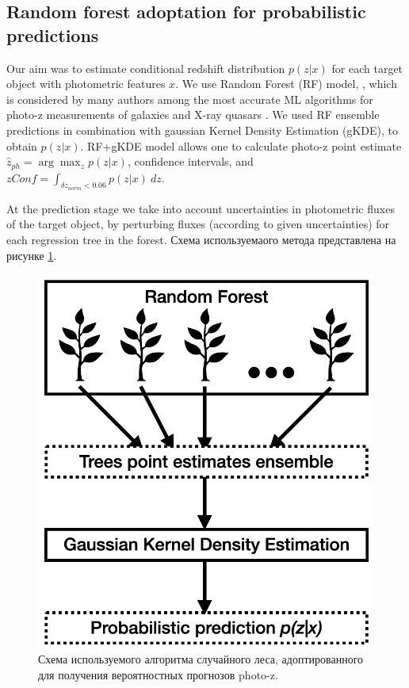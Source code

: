 \documentclass[fleqn,usenatbib]{mnras}
\begin{document}
\subsection{Random forest adoptation for probabilistic predictions}
Our aim was to estimate conditional redshift distribution $p(z|x)$ for each target object with photometric features $x$.
We use Random Forest (RF) model, \citep{2001MachL..45....5B,JMLR:v7:meinshausen06a}, which is considered by many authors among the most accurate ML algorithms for photo-z measurements of galaxies \citep{2020MNRAS.499.1587S,2020arXiv200912112E} and X-ray quasars \citep{2018AstL...44..735M}. We used RF ensemble predictions in combination with gaussian Kernel Density Estimation (gKDE), to obtain $p(z|x)$. RF+gKDE model allows one to calculate photo-z point estimate $\hat{z}_{ph} = \arg\max_z p(z|x)$, confidence intervals, and $zConf = \int_{\delta z_{norm} < 0.06} p(z|x)~dz$.

At the prediction stage we take into account uncertainties in photometric fluxes of the target object, by perturbing  fluxes (according to given uncertainties) for each regression tree in the forest. Схема используемаого метода представлена на рисунке \ref{fig:qrf_scheme}.

\begin{figure}
    \centering
    \includegraphics[width=0.95\linewidth]{images/qrf.png}
    \caption{Схема используемого алгоритма случайного леса, адоптированного для получения вероятностных прогнозов photo-z.}
    \label{fig:qrf_scheme}
\end{figure}
\end{document}
